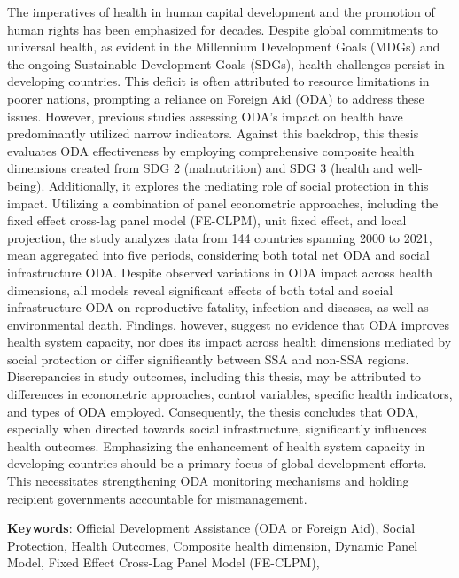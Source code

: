 The imperatives of health in human capital development and the promotion of human rights has been emphasized for decades. Despite global commitments to universal health, as evident in the Millennium Development Goals (MDGs) and the ongoing Sustainable Development Goals (SDGs), health challenges persist in developing countries. This deficit is often attributed to resource limitations in poorer nations, prompting a reliance on Foreign Aid (ODA) to address these issues. However, previous studies assessing ODA's impact on health have predominantly utilized narrow indicators. Against this backdrop, this thesis evaluates ODA effectiveness by employing comprehensive composite health dimensions created from SDG 2 (malnutrition) and SDG 3 (health and well-being). Additionally, it explores the mediating role of social protection in this impact. Utilizing a combination of panel econometric approaches, including the fixed effect cross-lag panel model (FE-CLPM), unit fixed effect, and local projection, the study analyzes data from 144 countries spanning 2000 to 2021, mean aggregated into five periods, considering both total net ODA and social infrastructure ODA. Despite observed variations in ODA impact across health dimensions, all models reveal significant effects of both total and social infrastructure ODA on reproductive fatality, infection and diseases, as well as environmental death. Findings, however, suggest no evidence that ODA improves health system capacity, nor does its impact across health dimensions mediated by social protection or differ significantly between SSA and non-SSA regions. Discrepancies in study outcomes, including this thesis, may be attributed to differences in econometric approaches, control variables, specific health indicators, and types of ODA employed. Consequently, the thesis concludes that ODA, especially when directed towards social infrastructure, significantly influences health outcomes. Emphasizing the enhancement of health system capacity in developing countries should be a primary focus of global development efforts. This necessitates strengthening ODA monitoring mechanisms and holding recipient governments accountable for mismanagement.

\vspace{10pt}
\textbf{Keywords}: Official Development Assistance (ODA or Foreign Aid), Social Protection, Health Outcomes, Composite health dimension, Dynamic Panel Model, Fixed Effect Cross-Lag Panel Model (FE-CLPM), 